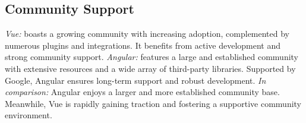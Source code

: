 
\subsection{Community Support}

\textit{Vue:} boasts a growing community with increasing adoption, complemented by numerous plugins and integrations. It benefits from active development and strong community support.
\newline\textit{Angular:} features a large and established community with extensive resources and a wide array of third-party libraries. Supported by Google, Angular ensures long-term support and robust development.
\newline\textit{In comparison:} Angular enjoys a larger and more established community base. Meanwhile, Vue is rapidly gaining traction and fostering a supportive community environment.




